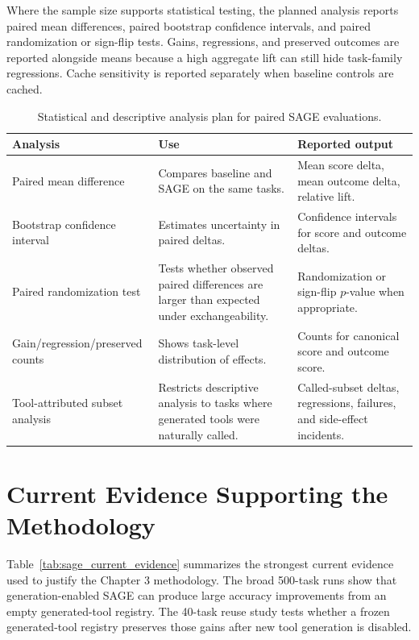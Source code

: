 Where the sample size supports statistical testing, the planned analysis reports paired mean differences, paired bootstrap confidence intervals, and paired randomization or sign-flip tests. Gains, regressions, and preserved outcomes are reported alongside means because a high aggregate lift can still hide task-family regressions. Cache sensitivity is reported separately when baseline controls are cached.

\begin{table}[H]
\centering
\footnotesize
\begin{tabularx}{\textwidth}{p{3.2cm} X X}
\toprule
\textbf{Analysis} & \textbf{Use} & \textbf{Reported output} \\
\midrule
Paired mean difference & Compares baseline and SAGE on the same tasks. & Mean score delta, mean outcome delta, relative lift. \\
\addlinespace
Bootstrap confidence interval & Estimates uncertainty in paired deltas. & Confidence intervals for score and outcome deltas. \\
\addlinespace
Paired randomization test & Tests whether observed paired differences are larger than expected under exchangeability. & Randomization or sign-flip $p$-value when appropriate. \\
\addlinespace
Gain/regression/preserved counts & Shows task-level distribution of effects. & Counts for canonical score and outcome score. \\
\addlinespace
Tool-attributed subset analysis & Restricts descriptive analysis to tasks where generated tools were naturally called. & Called-subset deltas, regressions, failures, and side-effect incidents. \\
\bottomrule
\end{tabularx}
\caption{Statistical and descriptive analysis plan for paired SAGE evaluations.}
\label{tab:sage_statistical_plan}
\end{table}

\section{Current Evidence Supporting the Methodology}
\label{sec:sage_current_evidence}

Table~\ref{tab:sage_current_evidence} summarizes the strongest current evidence used to justify the Chapter 3 methodology. The broad 500-task runs show that generation-enabled SAGE can produce large accuracy improvements from an empty generated-tool registry. The 40-task reuse study tests whether a frozen generated-tool registry preserves those gains after new tool generation is disabled.

